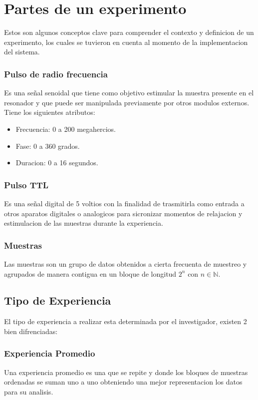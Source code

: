 \section{Partes de un experimento}

Estos son algunos conceptos clave para comprender el contexto y definicion de un
experimento, los cuales se tuvieron en cuenta al momento de la implementacion 
del sistema.

\subsubsection{Pulso de radio frecuencia}
Es una señal senoidal que tiene como objetivo
estimular la muestra presente en el resonador
y que puede ser manipulada previamente
por otros modulos externos. Tiene los siguientes atributos:
    \begin{itemize}
        \item Frecuencia: 0 a 200 megahercios.
        \item Fase: 0 a 360 grados.
        \item Duracion: 0 a 16 segundos.
    \end{itemize}

\subsubsection{Pulso TTL}
Es una señal digital de 5 voltios con la finalidad de trasmitirla como entrada a otros aparatos digitales o analogicos para sicronizar momentos de relajacion y estimulacion de las muestras durante la experiencia.

\subsubsection{Muestras}
Las muestras son un grupo de datos obtenidos a cierta frecuenta de muestreo y agrupados de manera contigua 
en un bloque de longitud $2^{n}$ con $n \in \mathbb{N}$. 

\subsection{Tipo de Experiencia}
El tipo de experiencia a realizar esta determinada por el investigador, existen 2 bien difrenciadas:

\subsubsection{Experiencia Promedio}
Una experiencia promedio es una que se repite y donde los bloques de muestras ordenadas se suman uno a uno obteniendo
una mejor representacion los datos para su analisis.

